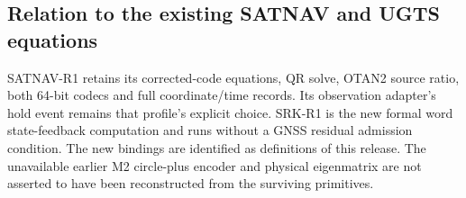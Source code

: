 \subsection{Relation to the existing SATNAV and UGTS equations}
SATNAV-R1 retains its corrected-code equations, QR solve, OTAN2 source ratio,
both 64-bit codecs and full coordinate/time records. Its observation adapter's
hold event remains that profile's explicit choice. SRK-R1 is the new formal word
state-feedback computation and runs without a GNSS residual admission condition.
The new bindings are identified as definitions of this release. The unavailable
earlier M2 circle-plus encoder and physical eigenmatrix are not asserted to have
been reconstructed from the surviving primitives.
\clearpage


